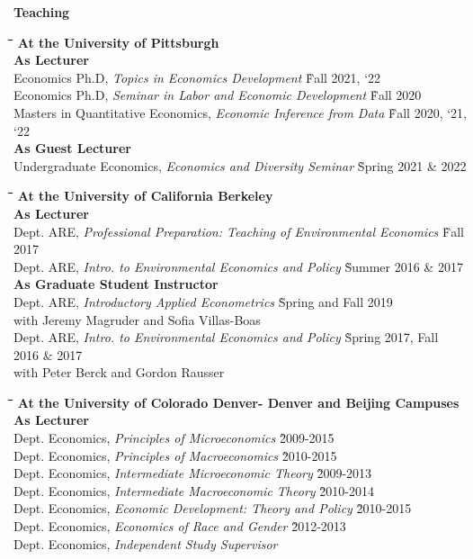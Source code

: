 \documentclass[10pt, oneside]{article}
\newcommand\mytabs{\hspace*{1cm}\=\hspace{1cm}\=\hspace{1cm}\=\hspace{1cm}\=\hspace{1cm}\=\hspace{1cm}\=\hspace{1cm}\=\hspace{1cm}\=\hspace{1cm}\=\hspace{1cm}}
\newenvironment{mysec}[1][\mytabs]
  {\begin{tabbing}#1\kill\ignorespaces}
  {\end{tabbing}}
\begin{document}
\begin{minipage}[t]{0.1\linewidth}
\textbf{Teaching}
\end{minipage}\hspace{0.05\linewidth}
\begin{minipage}[t]{0.8\linewidth}
\begin{mysec} 
\textbf{At the University of Pittsburgh} \\
\>\textbf{As Lecturer} \\
\>\>Economics Ph.D, \emph{Topics  in Economics Development}  \`Fall 2021, `22\\
\>\>Economics Ph.D, \emph{Seminar in Labor and Economic Development}  \`Fall 2020\\
\>\>Masters in Quantitative Economics, \emph{Economic Inference from Data}  \`Fall 2020, `21, `22\\
\>\textbf{As Guest Lecturer} \\
\>\>Undergraduate Economics, \emph{Economics and Diversity Seminar}  \`Spring 2021 \& 2022\\
\end{mysec}
\begin{mysec} 
\textbf{At the University of California Berkeley} \\
\>\textbf{As Lecturer} \\
\>\>Dept. ARE, \emph{Professional Preparation: Teaching of Environmental Economics}  \`Fall 2017 \\
\>\>Dept. ARE, \emph{Intro. to Environmental Economics and Policy}  \` Summer 2016 \& 2017 \\
\>\textbf{As Graduate Student Instructor} \\
\>\>Dept. ARE, \emph{Introductory Applied Econometrics}  \` Spring and Fall 2019 \\
\>\>\> with Jeremy Magruder and Sofia Villas-Boas\\
\>\>Dept. ARE, \emph{Intro. to Environmental Economics and Policy}  \` Spring 2017, Fall 2016 \& 2017 \\
\>\>\> with Peter Berck and Gordon Rausser
\end{mysec}
\begin{mysec} 
\textbf{At the University of Colorado Denver- Denver and Beijing Campuses} \\
\>\textbf{As Lecturer} \\
\>\>Dept. Economics, \emph{Principles of Microeconomics}  \`2009-2015 \\
\>\>Dept. Economics, \emph{Principles of Macroeconomics}  \`2010-2015\\
\>\>Dept. Economics, \emph{Intermediate Microeconomic Theory}  \`2009-2013\\
\>\>Dept. Economics, \emph{Intermediate Macroeconomic Theory}  \`2010-2014\\
\>\>Dept. Economics, \emph{Economic Development: Theory and Policy}  \`2010-2015\\
\>\>Dept. Economics, \emph{Economics of Race and Gender}  \`2012-2013\\
\>\>Dept. Economics, \emph{Independent Study Supervisor}  
\end{mysec}
\end{minipage}\vspace{5mm}
\end{document}
